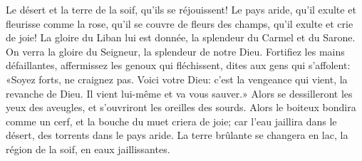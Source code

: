 Le désert et la terre de la soif, qu’ils se réjouissent!
	Le pays aride, qu’il exulte et fleurisse comme la rose,
	qu’il se couvre de fleurs des champs, qu’il exulte et crie de joie!
La gloire du Liban lui est donnée, la splendeur du Carmel et du Sarone.
	On verra la gloire du Seigneur, la splendeur de notre Dieu.
Fortifiez les mains défaillantes, affermissez les genoux qui fléchissent,
	dites aux gens qui s’affolent:
	«Soyez forts, ne craignez pas.
Voici votre Dieu: c’est la vengeance qui vient, la revanche de Dieu.
	Il vient lui-même et va vous sauver.»
Alors se dessilleront les yeux des aveugles, et s’ouvriront les oreilles des sourds.
	Alors le boiteux bondira comme un cerf, et la bouche du muet criera de joie;
	car l’eau jaillira dans le désert, des torrents dans le pays aride.
La terre brûlante se changera en lac, la région de la soif, en eaux jaillissantes.
